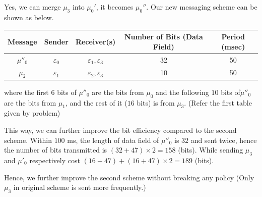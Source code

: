 \documentclass{article}
\begin{document}
\subsection{}
Yes, we can merge $\mu_3$ into $\mu_0'$, it becomes $\mu_0''$. Our new messaging scheme can be shown as below.
\begin{table}[H]
    \centering
    \begin{tabular}{|c|c|c|c|c|}
        \hline
        Message & Sender & Receiver(s) & Number of Bits (Data Field) & Period (msec) \\
        \hline
        $\mu''_0$ & $\varepsilon_0$ & $\varepsilon_1, \varepsilon_3$ & 32 & 50 \\
        \hline
        $\mu_2$  & $\varepsilon_1$ & $\varepsilon_2, \varepsilon_3$ & 10 & 50 \\
        \hline
    \end{tabular}
\end{table}
where the first $6$ bits of $\mu''_0$ are the bits from $\mu_0$ and the following $10$ bits of$\mu''_0$ are the bits from $\mu_1$, and the rest of it ($16$ bits) is from $\mu_3$. (Refer the first table given by problem)

This way, we can further improve the bit efficiency compared to the second scheme. Within $100$ ms, the length of data field of $\mu''_0$ is $32$ and sent twice, hence the number of bits transmitted is $(32+47)\times 2=158$ (bits). While sending $\mu_3$ and $\mu'_0$ respectively cost $(16+47)+(16+47)\times 2=189$ (bits).

Hence, we further improve the second scheme without breaking any policy (Only $\mu_3$ in original scheme is sent more frequently.)
\end{document}
